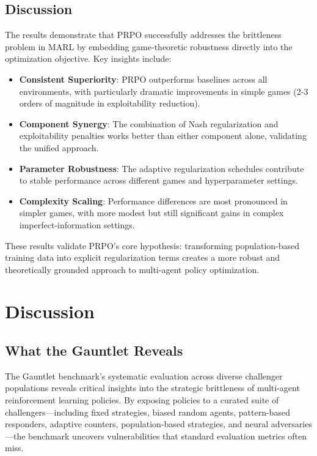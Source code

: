 \documentclass[sigconf,anonymous]{aamas}
\begin{document}
\subsection{Discussion}

The results demonstrate that PRPO successfully addresses the brittleness problem in MARL by embedding game-theoretic robustness directly into the optimization objective. Key insights include:

\begin{itemize}
\item \textbf{Consistent Superiority}: PRPO outperforms baselines across all environments, with particularly dramatic improvements in simple games (2-3 orders of magnitude in exploitability reduction).
\item \textbf{Component Synergy}: The combination of Nash regularization and exploitability penalties works better than either component alone, validating the unified approach.
\item \textbf{Parameter Robustness}: The adaptive regularization schedules contribute to stable performance across different games and hyperparameter settings.
\item \textbf{Complexity Scaling}: Performance differences are most pronounced in simpler games, with more modest but still significant gains in complex imperfect-information settings.
\end{itemize}

These results validate PRPO's core hypothesis: transforming population-based training data into explicit regularization terms creates a more robust and theoretically grounded approach to multi-agent policy optimization.





\section{Discussion}
\subsection{What the Gauntlet Reveals}

The Gauntlet benchmark's systematic evaluation across diverse challenger populations reveals critical insights into the strategic brittleness of multi-agent reinforcement learning policies. By exposing policies to a curated suite of challengers—including fixed strategies, biased random agents, pattern-based responders, adaptive counters, population-based strategies, and neural adversaries—the benchmark uncovers vulnerabilities that standard evaluation metrics often miss.
\end{document}

